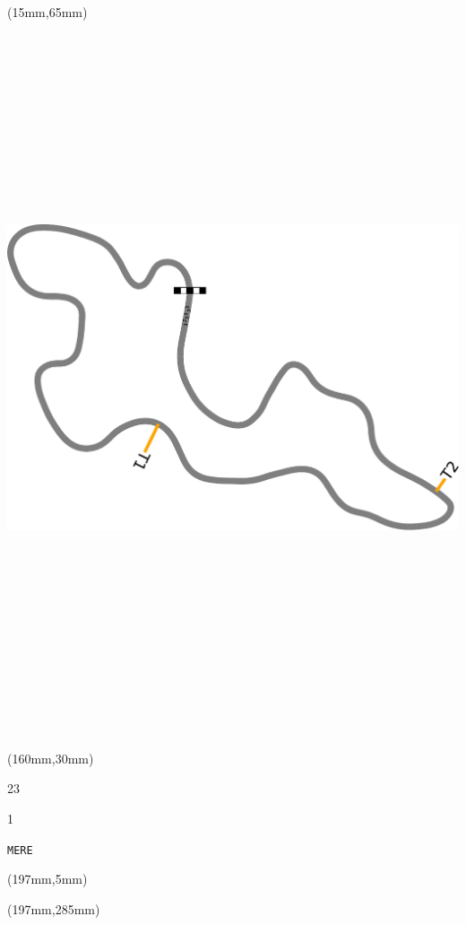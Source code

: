 \begin{textblock*}{185mm}(15mm,65mm)%
\centering
\mbox{\includegraphics[width=185mm,height=210mm,keepaspectratio]{PT/MERE.pdf}}
\end{textblock*}
\begin{textblock*}{40mm}(160mm,30mm)%
\Large
\par{} 
\par23 
\par1 
\par\hfill\tiny\tt MERE\\
\end{textblock*}
\begin{textblock*}{20mm}(197mm,5mm)%
\fbox{\thepage}
\label{MERE}
\end{textblock*}
\begin{textblock*}{20mm}(197mm,285mm)%
\fbox{\thepage}
\end{textblock*}

